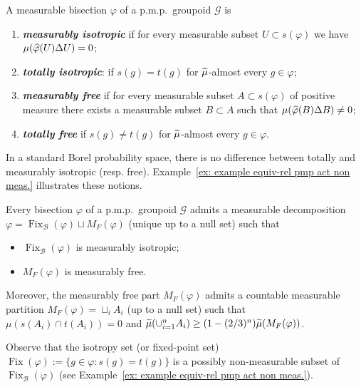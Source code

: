 \documentclass[AHL,Unicode,longabstracts,published]{cedram}
\newcommand{\defin}[1]{\textbf{\emph{#1}}}
\newcommand{\cg}{\mathcal{G}}
\newcommand{\rb}{\mathscr{B}}
\DeclareMathOperator{\Fix}{Fix}
\newcommand{\ph}{\varphi}
\newcommand{\pmp}{p.m.p.\ }
\let\oldtilde\tilde
\renewcommand*{\tilde}[1]{\mathchoice{\widetilde{#1}}{\widetilde{#1}}{\oldtilde{#1}}{\oldtilde{#1}}}
\let\oldhat\hat
\renewcommand*{\hat}[1]{\mathchoice{\widehat{#1}}{\widehat{#1}}{\oldhat{#1}}{\oldhat{#1}}}
\begin{document}
\begin{defi}\label{def: tot. vs meas isotrop, free}
A measurable bisection $\ph$ of a \pmp groupoid $\cg$ is
\begin{enumerate}
\item\label{defi2.11.1} \defin{measurably isotropic} if for every measurable subset $U\subset s(\ph)$ we have $\mu (\hat\ph(U)\Delta U)=0$;
\item \label{defi2.11.2} \defin{totally isotropic}: if $s(g)=t(g)$ for $\tilde\mu$-almost every $g\in {\ph}$;
\item \label{defi2.11.3} \defin{measurably free} if for every measurable subset $A\subset s(\ph)$ of positive measure there exists a measurable subset $B\subset A$ such that $\mu(\hat\ph(B)\Delta B)\not= 0$;
\item \label{defi2.11.4} \defin{totally free} if $s(g)\neq t(g)$ for $\tilde\mu$-almost every $g\in {\ph}$.
\end{enumerate}
\end{defi}

In a standard Borel probability space, there is no difference between totally and measurably isotropic (resp. free). Example~\ref{ex: example equiv-rel pmp act non meas.} illustrates these notions.

\begin{prop}\label{prop:manyinvo-gen}
Every bisection $\ph$ of a \pmp groupoid $\cg$ admits a measurable decomposition $\ph = \Fix_{\rb}(\ph)\sqcup M_F(\ph)$ (unique up to a null set) such that
\begin{itemize}
\item $\Fix_{\rb}(\ph)$ is measurably isotropic;
\item $M_F(\ph)$ is measurably free.
\end{itemize}

Moreover, the measurably free part $M_F(\ph)$ admits a countable measurable partition $M_F(\ph)=\sqcup_i A_i$ (up to a null set) such that $\mu(s(A_i)\cap t(A_i))=0$ and $\widetilde \mu(\cup_{i=1}^n A_i)\linebreak\geq (1-(2/3)^n) \widetilde \mu(M_F(\ph))$.
\end{prop}

Observe that the isotropy set (or fixed-point set) $\Fix(\ph):=\{g\in \ph: s(g)=t(g)\}$ is a possibly non-measurable subset of $ \Fix_{\rb}(\ph)$ (see Example~\ref{ex: example equiv-rel pmp act non meas.}).
\end{document}
